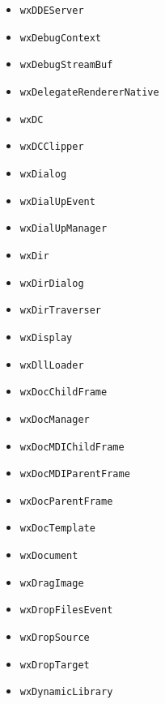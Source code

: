 \documentclass[a4paper,11pt,oneside,titlepage]{report}
\begin{document}
\begin{itemize}
\item \texttt{wxDDEServer}
\item \texttt{wxDebugContext}
\item \texttt{wxDebugStreamBuf}
\item \texttt{wxDelegateRendererNative}
\item \texttt{wxDC}
\item \texttt{wxDCClipper}
\item \texttt{wxDialog}
\item \texttt{wxDialUpEvent}
\item \texttt{wxDialUpManager}
\item \texttt{wxDir}
\item \texttt{wxDirDialog}
\item \texttt{wxDirTraverser}
\item \texttt{wxDisplay}
\item \texttt{wxDllLoader}
\item \texttt{wxDocChildFrame}
\item \texttt{wxDocManager}
\item \texttt{wxDocMDIChildFrame}
\item \texttt{wxDocMDIParentFrame}
\item \texttt{wxDocParentFrame}
\item \texttt{wxDocTemplate}
\item \texttt{wxDocument}
\item \texttt{wxDragImage}
\item \texttt{wxDropFilesEvent}
\item \texttt{wxDropSource}
\item \texttt{wxDropTarget}
\item \texttt{wxDynamicLibrary}


\end{itemize}
\end{document}
